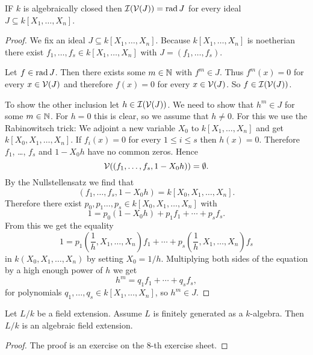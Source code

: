 \begin{cor}
  IF $k$ is algebraically closed then $\mathcal{I}(\mathcal{V}(J)) = \operatorname{rad} J$ for every ideal $J \subseteq k[X_1, \dotsc, X_n]$.
\end{cor}
\begin{proof}
  We fix an ideal $J \subseteq k[X_1, \dotsc, X_n]$.
  Because $k[X_1, \dotsc, X_n]$ is noetherian there exist $f_1, \dotsc, f_s \in k[X_1, \dotsc, X_n]$ with $J = (f_1, \dotsc, f_s)$.
  
  Let $f \in \operatorname{rad} J$.
  Then there exists some $m \in \mathbb{N}$ with $f^m \in J$.
  Thus $f^m(x) = 0$ for every $x \in \mathcal{V}(J)$ and therefore $f(x) = 0$ for every $x \in \mathcal{V}(J)$.
  So $f \in \mathcal{I}(\mathcal{V}(J))$.
  
  To show the other inclusion let $h \in \mathcal{I}(\mathcal{V}(J))$.
  We need to show that $h^m \in J$ for some $m \in \mathbb{N}$.
  For $h = 0$ this is clear, so we assume that $h \neq 0$.
  For this we use the Rabinowitsch trick:
  We adjoint a new variable $X_0$ to $k[X_1, \dotsc, X_n]$ and get $k[X_0, X_1, \dotsc, X_n]$.
  If $f_i(x) = 0$ for every $1 \leq i \leq s$ then $h(x) = 0$.
  Therefore $f_1$, \dots, $f_s$ and $1 - X_0 h$ have no common zeros.
  Hence
  \[
      \mathcal{V}((f_1, \dotsc, f_s, 1 - X_0 h))
    = \emptyset.
  \]
  By the Nullstellensatz we find that
  \[
      ( f_1, \dotsc, f_s, 1 - X_0 h )
    = k[X_0, X_1, \dotsc, X_n].
  \]
  Therefore there exist $p_0, p_1 \ldots, p_s \in k[X_0, X_1, \dotsc, X_n]$ with
  \[
      1
    = p_0 (1 - X_0 h) + p_1 f_1 + \dotsb + p_s f_s.
  \]
  From this we get the equality
  \[
      1
    =   p_1 \left(\frac{1}{h}, X_1, \dotsc, X_n\right) f_1
      + \dotsb
      + p_s \left(\frac{1}{h}, X_1, \dotsc, X_n\right) f_s
  \]
  in $k(X_0, X_1, \dotsc, X_n)$ by setting $X_0 = 1 / h$.
  Multiplying both sides of the equation by a high enough power of $h$ we get
  \[
      h^m
    = q_1 f_1 + \dotsb + q_s f_s,
  \]
  for polynomials $q_1, \dotsc, q_s \in k[X_1, \dotsc, X_n]$, so $h^m \in J$.
\end{proof}


\begin{lem}\label{lem: finitely generated field extensions are algebraic}
  Let $L/k$ be a field extension.
  Assume $L$ is finitely generated as a $k$-algebra.
  Then $L/k$ is an algebraic field extension.
\end{lem}
\begin{proof}
  The proof is an exercise on the $8$-th exercise sheet.
\end{proof}


